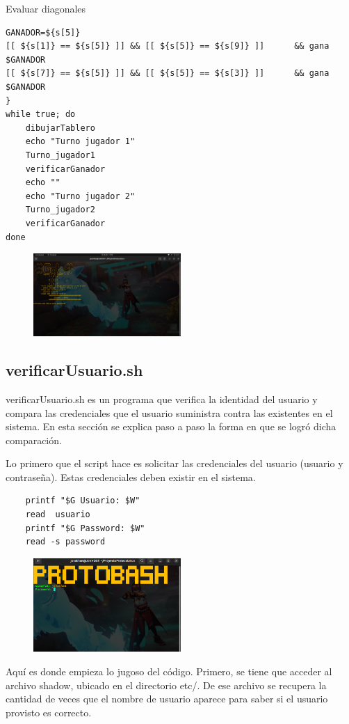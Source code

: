 \documentclass[letterpaper,12pt]{article} %
\begin{document}
Evaluar diagonales

 \begin{verbatim}
GANADOR=${s[5]}
[[ ${s[1]} == ${s[5]} ]] && [[ ${s[5]} == ${s[9]} ]]      && gana $GANADOR
[[ ${s[7]} == ${s[5]} ]] && [[ ${s[5]} == ${s[3]} ]]      && gana $GANADOR
}
while true; do
    dibujarTablero
    echo "Turno jugador 1"
    Turno_jugador1
    verificarGanador
    echo ""
    echo "Turno jugador 2"
    Turno_jugador2
    verificarGanador
done

\end{verbatim}

\begin{figure}[H]
    \centering
    \includegraphics[width=0.5\textwidth]{figurasShell/Jugar7.png}
\end{figure}

\subsection{verificarUsuario.sh}

verificarUsuario.sh es un programa que verifica la identidad del usuario y compara las credenciales que el usuario suministra contra las existentes en el sistema. En esta sección se explica paso a paso la forma en que se logró dicha comparación.

Lo primero que el script hace es solicitar las credenciales del usuario (usuario y contraseña). Estas credenciales deben existir en el sistema.

 \begin{verbatim}
    printf "$G Usuario: $W"
    read  usuario
    printf "$G Password: $W"
    read -s password
\end{verbatim}
\begin{figure}[H]
    \centering
    \includegraphics[width=0.5\textwidth]{figurasShell/ProtoBash1.png}
\end{figure}
Aquí es donde empieza lo jugoso del código. Primero, se tiene que acceder al archivo shadow, ubicado en el directorio etc/. De ese archivo se recupera la cantidad de veces que el nombre de usuario aparece para saber si el usuario provisto es correcto.
\end{document}

